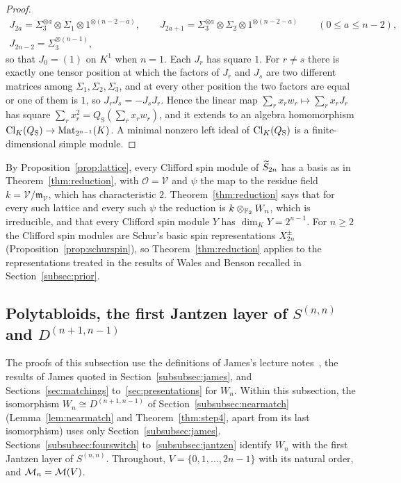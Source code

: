 \begin{proof}
\begin{gather*}
J_{2a}=\Sigma_3^{\otimes a}\otimes\Sigma_1\otimes1^{\otimes(n-2-a)},\qquad J_{2a+1}=\Sigma_3^{\otimes a}\otimes\Sigma_2\otimes1^{\otimes(n-2-a)}\qquad(0\le a\le n-2),\\
J_{2n-2}=\Sigma_3^{\otimes(n-1)},
\end{gather*}
so that $J_0=(1)$ on $K^1$ when $n=1$. Each $J_r$ has square $1$. For $r\ne s$ there is exactly one tensor position at which the factors of $J_r$ and $J_s$ are two different matrices among $\Sigma_1,\Sigma_2,\Sigma_3$, and at every other position the two factors are equal or one of them is $1$, so $J_{r}J_s=-J_{s}J_r$. Hence the linear map $\sum_{r}x_{r}w_r\mapsto\sum_{r}x_{r}J_r$ has square $\sum_{r}x_r^2=Q_{\mathrm S}(\sum_{r}x_{r}w_r)$, and it extends to an algebra homomorphism $\operatorname{Cl}_K(Q_{\mathrm S})\to\mathrm{Mat}_{2^{n-1}}(K)$. A minimal nonzero left ideal of $\operatorname{Cl}_K(Q_{\mathrm S})$ is a finite-dimensional simple module.
\end{proof}

By Proposition~\ref{prop:lattice}, every Clifford spin module of $\widetilde{S}_{2n}$ has a basis as in Theorem~\ref{thm:reduction}, with $\mathcal O=\mathcal V$ and $\psi$ the map to the residue field $k=\mathcal V/\mathfrak m_{\mathcal V}$, which has characteristic $2$. Theorem~\ref{thm:reduction} says that for every such lattice and every such $\psi$ the reduction is $k\otimes_{\mathbb{F}_2}W_n$, which is irreducible, and that every Clifford spin module $Y$ has $\dim_{K}Y=2^{n-1}$. For $n\ge2$ the Clifford spin modules are Schur's basic spin representations $X_{2n}^\pm$ (Proposition~\ref{prop:schurspin}), so Theorem~\ref{thm:reduction} applies to the representations treated in the results of Wales and Benson recalled in Section~\ref{subsec:prior}.

\subsection{Polytabloids, the first Jantzen layer of \texorpdfstring{$S^{(n,n)}$}{S\textasciicircum(n,n)} and \texorpdfstring{$D^{(n+1,n-1)}$}{D\textasciicircum(n+1,n-1)}}\label{subsec:specht}

The proofs of this subsection use the definitions of James's lecture notes~\cite{James78}, the results of James quoted in Section~\ref{subsubsec:james}, and Sections~\ref{sec:matchings} to~\ref{sec:presentations} for $W_n$. Within this subsection, the isomorphism $W_n\cong D^{(n+1,n-1)}$ of Section~\ref{subsubsec:nearmatch} (Lemma~\ref{lem:nearmatch} and Theorem~\ref{thm:step4}, apart from its last isomorphism) uses only Section~\ref{subsubsec:james}. Sections~\ref{subsubsec:fourswitch} to~\ref{subsubsec:jantzen} identify $W_n$ with the first Jantzen layer of $S^{(n,n)}$. Throughout, $V=\{0,1,\dots,2n-1\}$ with its natural order, and $\mathcal{M}_n=\mathcal{M}(V)$.

